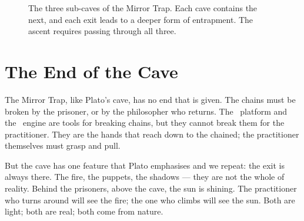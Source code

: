 \begin{figure}[ht]
\centering
{}
\caption{The three sub-caves of the Mirror Trap. Each cave contains the next, and
each exit leads to a deeper form of entrapment. The ascent requires passing
through all three.\label{fig:subcaves}}
\end{figure}

\section{The End of the Cave}

The Mirror Trap, like Plato's cave, has no end that is given. The chains must
be broken by the prisoner, or by the philosopher who returns. The \praxis\
platform and the \physis\ engine are tools for breaking chains, but they cannot
break them for the practitioner. They are the hands that reach down to the
chained; the practitioner themselves must grasp and pull.

But the cave has one feature that Plato emphasises and we repeat: the exit is
always there. The fire, the puppets, the shadows --- they are not the whole of
reality. Behind the prisoners, above the cave, the sun is shining. The
practitioner who turns around will see the fire; the one who climbs will see
the sun. Both are light; both are real; both come from nature.
